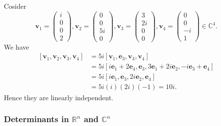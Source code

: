 \documentclass[a4paper]{article}
\begin{document}
    \begin{example}
      Cosider
      \[
        \mathbf{v}_1=
        \begin{pmatrix}
          i\\0\\0\\2
        \end{pmatrix},
        \mathbf{v}_2=
        \begin{pmatrix}
          0\\0\\5i\\0
        \end{pmatrix},
        \mathbf{v}_3=
        \begin{pmatrix}
          3\\2i\\0\\0
        \end{pmatrix},
        \mathbf{v}_4=
        \begin{pmatrix}
          0\\0\\-i\\1
        \end{pmatrix}\in \mathbb{C}^{4}
      .\]
      We have
      \[
        \begin{aligned}
          [\mathbf{v}_1,\mathbf{v}_2,\mathbf{v}_3,\mathbf{v}_4]&=5i[\mathbf{v}_1,\mathbf{e}_3,\mathbf{v}_3,\mathbf{v}_4]\\
          &= 5i[i\mathbf{e}_1+2\mathbf{e}_4,
          \mathbf{e}_3,3\mathbf{e}_1+2i\mathbf{e}_2,-i\mathbf{e}_3+\mathbf{e}_4]\\
          &= 5i[i\mathbf{e}_1,\mathbf{e}_3,2i\mathbf{e}_2,\mathbf{e}_4]\\
          &= 5i(i)(2i)(-1)=10i.
        \end{aligned}
      \]
      Hence they are linearly independent.
    \end{example}
    \subsubsection{Determinants in $ \mathbb{R}^{n} $ and $ \mathbb{C}^{n} $}
\end{document}
